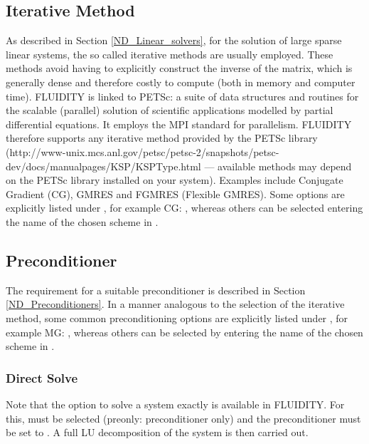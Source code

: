 \subsection{Iterative Method}
As described in Section \ref{ND_Linear_solvers}, for the solution of large sparse linear systems, the so called iterative methods are usually employed. These methods avoid having to explicitly construct the inverse of the matrix, which is generally dense and therefore costly to compute (both in memory and computer time). FLUIDITY is linked to PETSc: a suite of data structures and routines for the scalable (parallel) solution of scientific applications modelled by partial differential equations.  It employs the MPI standard for parallelism. FLUIDITY therefore supports any iterative method provided by the PETSc library (http://www-unix.mcs.anl.gov/petsc/petsc-2/snapshots/petsc-dev/docs/manualpages/KSP/KSPType.html --- available methods may depend on the PETSc library installed on your system). Examples include Conjugate Gradient (CG), GMRES and FGMRES (Flexible GMRES). Some options are explicitly listed under , for example CG: , whereas others can be selected entering the name of the chosen scheme in .

\subsection{Preconditioner}

The requirement for a suitable preconditioner is described in Section \ref{ND_Preconditioners}. In a manner analogous to the selection of the iterative method, some common preconditioning options are explicitly listed under , for example MG: , whereas others can be selected by entering the name of the chosen scheme in . 

\subsubsection{Direct Solve}

Note that the option to solve a system exactly is available in FLUIDITY. For this,  must be selected (preonly: preconditioner only) and the preconditioner must be set to . A full LU decomposition of the system is then carried out.

